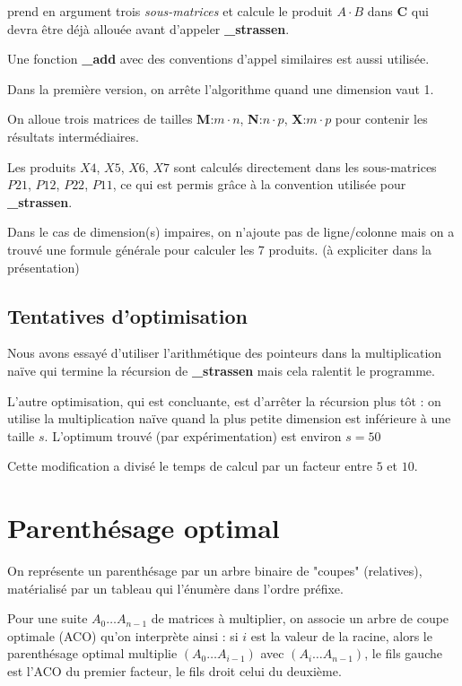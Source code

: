 \documentclass[a4paper]{article}
\begin{document}
prend en argument trois {\it sous-matrices} et calcule le produit
$A \cdot B$ dans {\bf C} qui devra être déjà allouée avant d'appeler
{\bf \_strassen}.

Une fonction {\bf \_add} avec des conventions d'appel similaires
est aussi utilisée.

Dans la première version, on arrête l'algorithme quand une dimension
vaut 1.

On alloue trois matrices de tailles {\bf M}:$m \cdot n$,
{\bf N}:$n \cdot p$, {\bf X}:$m \cdot p$
pour contenir les résultats intermédiaires.

Les produits $X4$, $X5$, $X6$, $X7$ sont calculés directement dans les
sous-matrices $P21$, $P12$, $P22$, $P11$, ce qui est permis grâce
à la convention utilisée pour {\bf \_strassen}.

Dans le cas de dimension(s) impaires, on n'ajoute pas de ligne/colonne
mais on a trouvé une formule générale pour calculer les 7 produits.
(à expliciter dans la présentation)

\subsection{Tentatives d'optimisation}

Nous avons essayé d'utiliser l'arithmétique des pointeurs dans la
multiplication naïve qui termine la récursion de {\bf \_strassen}
mais cela ralentit le programme.

L'autre optimisation, qui est concluante, est d'arrêter la récursion
plus tôt : on utilise la multiplication naïve 
quand la plus petite dimension est inférieure à une taille
$s$. L'optimum trouvé (par expérimentation) est environ $s=50$

Cette modification a divisé le temps de calcul
par un facteur entre $5$ et $10$.

\section{Parenthésage optimal}

On représente un parenthésage par un arbre binaire de "coupes" (relatives),
matérialisé par un tableau qui l'énumère dans l'ordre préfixe.

Pour une suite $A_0 \dots A_{n-1}$ de matrices à multiplier, on associe un
arbre de coupe optimale (ACO) qu'on interprète ainsi : si $i$ est la valeur
de la racine, alors le parenthésage optimal multiplie $(A_0 \dots A_{i-1})$
avec $(A_i \dots A_{n-1})$, le fils gauche est l'ACO du premier facteur,
le fils droit celui du deuxième.
\end{document}

